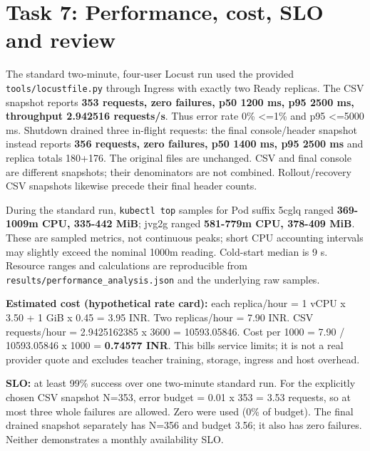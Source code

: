 \documentclass[10pt,a4paper]{article}
\begin{document}
\section{Task 7: Performance, cost, SLO and review}

The standard two-minute, four-user Locust run used the provided \texttt{tools/\allowbreak{}locustfile.py} through Ingress with exactly two Ready replicas. The CSV snapshot reports \textbf{353 requests, zero failures, p50 1200 ms, p95 2500 ms, throughput 2.942516 requests/s}. Thus error rate 0\% \textless{}=1\% and p95 \textless{}=5000 ms. Shutdown drained three in-flight requests: the final console/header snapshot instead reports \textbf{356 requests, zero failures, p50 1400 ms, p95 2500 ms} and replica totals 180+176. The original files are unchanged. CSV and final console are different snapshots; their denominators are not combined. Rollout/recovery CSV snapshots likewise precede their final header counts.


During the standard run, \texttt{kubectl top} samples for Pod suffix 5cglq ranged \textbf{369-1009m CPU, 335-442 MiB}; jvg2g ranged \textbf{581-779m CPU, 378-409 MiB}. These are sampled metrics, not continuous peaks; short CPU accounting intervals may slightly exceed the nominal 1000m reading. Cold-start median is 9 s. Resource ranges and calculations are reproducible from \texttt{results/\allowbreak{}performance\_\allowbreak{}analysis.json} and the underlying raw samples.


\textbf{Estimated cost (hypothetical rate card):} each replica/hour = 1 vCPU x 3.50 + 1 GiB x 0.45 = 3.95 INR. Two replicas/hour = 7.90 INR. CSV requests/hour = 2.9425162385 x 3600 = 10593.05846. Cost per 1000 = 7.90 / 10593.05846 x 1000 = \textbf{0.74577 INR}. This bills service limits; it is not a real provider quote and excludes teacher training, storage, ingress and host overhead.


\textbf{SLO:} at least 99\% success over one two-minute standard run. For the explicitly chosen CSV snapshot N=353, error budget = 0.01 x 353 = 3.53 requests, so at most three whole failures are allowed. Zero were used (0\% of budget). The final drained snapshot separately has N=356 and budget 3.56; it also has zero failures. Neither demonstrates a monthly availability SLO.
\end{document}
